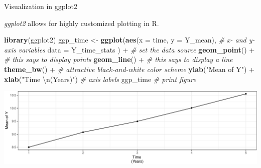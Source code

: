 \documentclass[10pt,ignorenonframetext,]{beamer}
\newenvironment{Shaded}{\begin{snugshade}}{\end{snugshade}}
\newcommand{\KeywordTok}[1]{\textcolor[rgb]{0.13,0.29,0.53}{\textbf{{#1}}}}
\newcommand{\DataTypeTok}[1]{\textcolor[rgb]{0.13,0.29,0.53}{{#1}}}
\newcommand{\CharTok}[1]{\textcolor[rgb]{0.31,0.60,0.02}{{#1}}}
\newcommand{\StringTok}[1]{\textcolor[rgb]{0.31,0.60,0.02}{{#1}}}
\newcommand{\CommentTok}[1]{\textcolor[rgb]{0.56,0.35,0.01}{\textit{{#1}}}}
\newcommand{\NormalTok}[1]{{#1}}
\begin{document}
\begin{frame}[fragile]{Visualization in ggplot2}

\emph{ggplot2} allows for highly customized plotting in R.

\footnotesize

\begin{Shaded}
\begin{Highlighting}[]
\KeywordTok{library}\NormalTok{(ggplot2)}
\NormalTok{ggp_time <-}\StringTok{ }\KeywordTok{ggplot}\NormalTok{(}\KeywordTok{aes}\NormalTok{(}\DataTypeTok{x =} \NormalTok{time, }\DataTypeTok{y =} \NormalTok{Y_mean), }\CommentTok{# x- and y-axis variables}
  \DataTypeTok{data =} \NormalTok{Y_time_stats}
\NormalTok{) +}\StringTok{ }\CommentTok{# set the data source}
\StringTok{  }\KeywordTok{geom_point}\NormalTok{() +}\StringTok{ }\CommentTok{# this says to display points}
\StringTok{  }\KeywordTok{geom_line}\NormalTok{() +}\StringTok{ }\CommentTok{# this says to display a line}
\StringTok{  }\KeywordTok{theme_bw}\NormalTok{() +}\StringTok{ }\CommentTok{# attractive black-and-white color scheme}
\StringTok{  }\KeywordTok{ylab}\NormalTok{(}\StringTok{"Mean of Y"}\NormalTok{) +}\StringTok{ }\KeywordTok{xlab}\NormalTok{(}\StringTok{"Time }\CharTok{\textbackslash{}n}\StringTok{(Years)"}\NormalTok{) }\CommentTok{# axis labels}
\NormalTok{ggp_time }\CommentTok{# print figure}
\end{Highlighting}
\end{Shaded}

\includegraphics{r-tutorial_files/figure-beamer/unnamed-chunk-12-1.pdf}

\normalsize

\end{frame}
\end{document}
